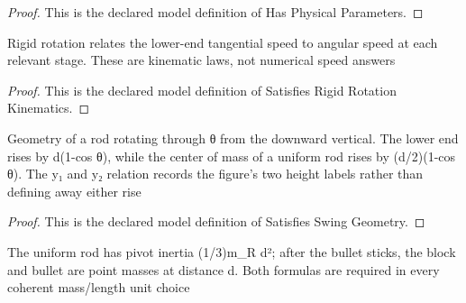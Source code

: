 \begin{proof}
  This is the declared model definition of Has Physical Parameters.
\end{proof}
\begin{definition}
  \label{def:physics:phyx-mini-0713:phyxminiproblems-problemphyxmini0713-satisfiesrigidrotationkinematics}
  Rigid rotation relates the lower-end tangential speed to angular speed at each relevant stage. These are kinematic laws, not numerical speed answers
\end{definition}
\begin{proof}
  This is the declared model definition of Satisfies Rigid Rotation Kinematics.
\end{proof}
\begin{definition}
  \label{def:physics:phyx-mini-0713:phyxminiproblems-problemphyxmini0713-satisfiesswinggeometry}
  Geometry of a rod rotating through θ from the downward vertical. The lower end rises by d(1-cos θ), while the center of mass of a uniform rod rises by (d/2)(1-cos θ). The y₁ and y₂ relation records the figure's two height labels rather than defining away either rise
\end{definition}
\begin{proof}
  This is the declared model definition of Satisfies Swing Geometry.
\end{proof}
\begin{definition}
  \label{def:physics:phyx-mini-0713:phyxminiproblems-problemphyxmini0713-satisfiesrigidassemblyinertiamodel}
  The uniform rod has pivot inertia (1/3)m\_R d²; after the bullet sticks, the block and bullet are point masses at distance d. Both formulas are required in every coherent mass/length unit choice
\end{definition}
